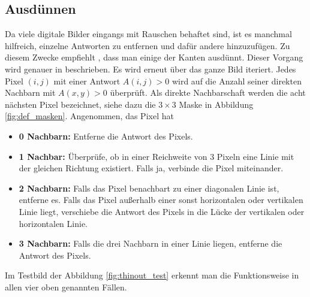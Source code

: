 \documentclass[a4paper, 11pt]{report}
\theoremstyle{definition}
\begin{document}
		\subsection{Ausdünnen}\label{ssec:thinout}
			Da viele digitale Bilder eingangs mit Rauschen behaftet sind, ist es manchmal hilfreich, einzelne Antworten zu entfernen und dafür andere hinzuzufügen. Zu diesem Zwecke empfiehlt \cite{SUSAN}, dass man einige der Kanten ausdünnt. Dieser Vorgang wird genauer in \cite{thinout} beschrieben.
			Es wird erneut über das ganze Bild iteriert. Jedes Pixel $(i,j)$ mit einer Antwort $A(i,j) > 0$ wird auf die Anzahl seiner direkten Nachbarn mit $A(x,y) > 0$ überprüft. Als direkte Nachbarschaft werden die acht nächsten Pixel bezeichnet, siehe dazu die $3\times 3$ Maske in Abbildung \ref{fig:def_masken}. Angenommen, das Pixel hat
			\begin{itemize}
				\item \textbf{0 Nachbarn:}
					Entferne die Antwort des Pixels.
				\item \textbf{1 Nachbar:}
					Überprüfe, ob in einer Reichweite von 3 Pixeln eine Linie mit der gleichen Richtung existiert. Falls ja, verbinde die Pixel miteinander.
				\item \textbf{2 Nachbarn:}
					Falls das Pixel benachbart zu einer diagonalen Linie ist, entferne es.
					Falls das Pixel außerhalb einer sonst horizontalen oder vertikalen Linie liegt, verschiebe die Antwort des Pixels in die Lücke der vertikalen oder horizontalen Linie.
				\item \textbf{3 Nachbarn:}
					Falls die drei Nachbarn in einer Linie liegen, entferne die Antwort des Pixels.
			\end{itemize}

			Im Testbild der Abbildung \ref{fig:thinout_test} erkennt man die Funktionsweise in allen vier oben genannten Fällen.
\end{document}
